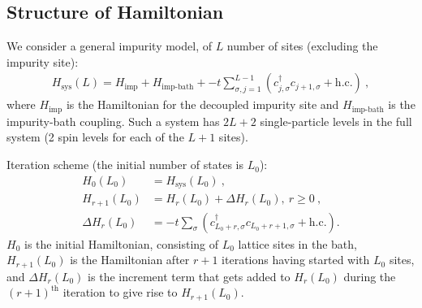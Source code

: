 \subsection*{Structure of Hamiltonian}
We consider a general impurity model, of \(L\) number of sites (excluding the impurity site):
\begin{equation}\begin{aligned}\label{hamiltonian}
	H_\text{sys}(L) = H_\text{imp} + H_\text{imp-bath} +  
	- t\sum_{\sigma, j = 1}^{L-1}\left(c^\dagger_{j,\sigma}c_{j+1,\sigma} + \text{h.c.}\right) ~,
\end{aligned}\end{equation}
where \(H_\text{imp}\) is the Hamiltonian for the decoupled impurity site and \(H_\text{imp-bath}\) is the impurity-bath coupling. Such a system has \(2L+2\) single-particle levels in the full system (2 spin levels for each of the \(L+1\) sites).

Iteration scheme (the initial number of states is \(L_0\)):
\begin{equation}\begin{aligned}\label{iterationScheme}
	H_0(L_0) &= H_\text{sys}(L_0)~,\\
	H_{r+1}(L_0) &= H_r(L_0) + \Delta H_r(L_0), ~ r \geq 0~,\\
	\Delta H_r(L_0) &= - t\sum_{\sigma}\left(c^\dagger_{L_0 + r,\sigma}c_{L_0 + r+1,\sigma} + \text{h.c.}\right).
\end{aligned}\end{equation}
\(H_0\) is the initial Hamiltonian, consisting of \(L_0\) lattice sites in the bath, \(H_{r+1}(L_0)\) is the Hamiltonian after \(r+1\) iterations having started with \(L_0\) sites, and \(\Delta H_r(L_0)\) is the increment term that gets added to \(H_r(L_0)\) during the \((r+1)^\text{th}\) iteration to give rise to \(H_{r+1}(L_0)\). 

